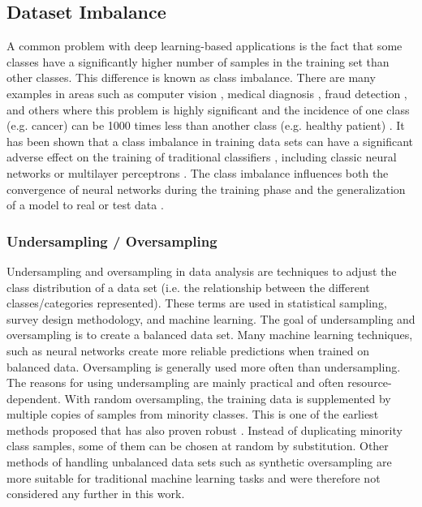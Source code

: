 \documentclass[journal]{IEEEtran}
\begin{document}
\subsection{Dataset Imbalance}
A common problem with deep learning-based applications is the fact that some classes have a significantly higher number of samples in the training set than other classes. This difference is known as class imbalance. There are many examples in areas such as computer vision \cite{van2018inaturalist, xiao2010sun, johnson2013hybrid, kubat1998machine, beijbom2012automated}, medical diagnosis \cite{grzymala2004approach, mac2002problem}, fraud detection \cite{philip1998toward}, and others \cite{radivojac2004classification, cardie1997improving, haixiang2017learning} where this problem is highly significant and the incidence of one class (e.g. cancer) can be 1000 times less than another class (e.g. healthy patient) \cite{buda2018systematic}. It has been shown that a class imbalance in training data sets can have a significant adverse effect on the training of traditional classifiers \cite{japkowicz2002class}, including classic neural networks or multilayer perceptrons \cite{mazurowski2008training}. The class imbalance influences both the convergence of neural networks during the training phase and the generalization of a model to real or test data \cite{buda2018systematic}.

\subsubsection{Undersampling / Oversampling}
Undersampling and oversampling in data analysis are techniques to adjust the class distribution of a data set (i.e. the relationship between the different classes/categories represented). These terms are used in statistical sampling, survey design methodology, and machine learning. The goal of undersampling and oversampling is to create a balanced data set. Many machine learning techniques, such as neural networks create more reliable predictions when trained on balanced data. Oversampling is generally used more often than undersampling. The reasons for using undersampling are mainly practical and often resource-dependent. With random oversampling, the training data is supplemented by multiple copies of samples from minority classes. This is one of the earliest methods proposed that has also proven robust \cite{ling1998data}. Instead of duplicating minority class samples, some of them can be chosen at random by substitution. Other methods of handling unbalanced data sets such as synthetic oversampling \cite{chawla2002smote} are more suitable for traditional machine learning tasks \cite{fernandez2018smote} and were therefore not considered any further in this work.
\end{document}
